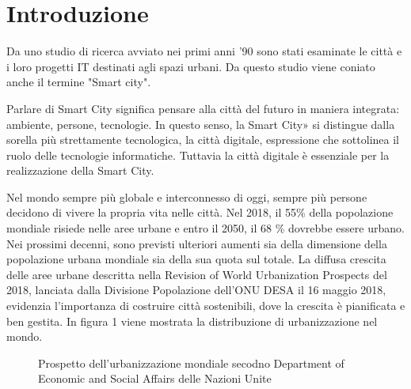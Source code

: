 \chapter*{Introduzione}
Da uno studio di ricerca avviato nei primi anni '90 sono stati esaminate le città e i loro progetti IT destinati agli spazi urbani. Da questo studio viene coniato anche il termine "Smart city".\cite{smart_city_terminology}\cite{smart:city_cybersecurity_privacy_cap2_1}

Parlare di Smart City significa pensare alla città del futuro in maniera integrata: ambiente, persone, tecnologie. In questo senso, la Smart City» si distingue dalla sorella più strettamente tecnologica, la città digitale, espressione che sottolinea il ruolo delle tecnologie informatiche. Tuttavia la città digitale è essenziale per la realizzazione della Smart City.

Nel mondo sempre più globale e interconnesso di oggi, sempre più persone decidono di vivere la propria vita nelle città. Nel 2018, il 55\% della popolazione mondiale risiede nelle aree urbane e entro il 2050, il 68 \% dovrebbe essere urbano. Nei prossimi decenni, sono previsti ulteriori aumenti sia della dimensione della popolazione urbana mondiale sia della sua quota sul totale. La diffusa crescita delle aree urbane descritta nella Revision of World Urbanization Prospects del 2018, lanciata dalla Divisione Popolazione dell'ONU DESA il 16 maggio 2018, evidenzia l'importanza di costruire città sostenibili, dove la crescita è pianificata e ben gestita.\cite{ONU_UDESA_urbanization}
In figura 1 viene mostrata la distribuzione di urbanizzazione nel mondo.
\begin{figure}[ht]
	\begin{center}
		\caption{Prospetto dell'urbanizzazione mondiale secodno Department of Economic and Social Affairs delle Nazioni Unite}
	\end{center}
\end{figure}

